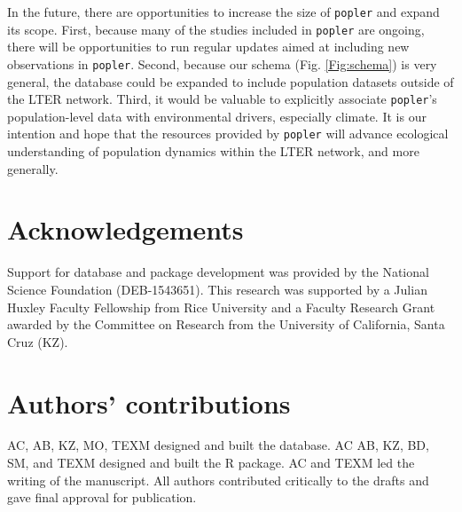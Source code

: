\documentclass{article}\usepackage[]{graphicx}\usepackage[]{color}
\newcommand{\tom}[1]{{\textit{\color{red}{[#1]}}}}
\begin{document}
In the future, there are opportunities to increase the size of \texttt{popler} and expand its scope. First, because many of the studies included in \texttt{popler} are ongoing, there will be opportunities to run regular updates aimed at including new observations in \texttt{popler}.  Second, because our schema (Fig. \ref{Fig:schema}) is very general, the database could be expanded to include population datasets outside of the LTER network. Third, it would be valuable to explicitly associate \texttt{popler}'s population-level data with environmental drivers, especially climate. It is our intention and hope that the resources provided by \texttt{popler} will advance ecological understanding of population dynamics within the LTER network, and more generally.

\section*{Acknowledgements}
Support for database and package development was provided by the National Science Foundation (DEB-1543651). This research was supported by a Julian Huxley Faculty Fellowship from Rice University and a Faculty Research Grant awarded by the Committee on Research from the University of California, Santa Cruz (KZ). \tom{We should probably acknowledge NSF support of LTER, as well as coauthor-specific acknowledgements. }

\section*{Authors' contributions}
AC, AB, KZ, MO, TEXM designed and built the database. AC AB, KZ, BD, SM, and TEXM designed and built the R package. AC and TEXM led the writing of the manuscript. All authors contributed critically to the drafts and gave final approval for publication.


\end{document}
